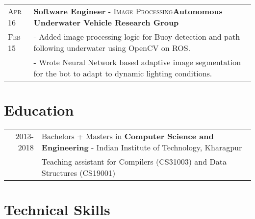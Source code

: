 \documentclass[a4paper,10pt]{extarticle} %
\begin{document}
\begin{tabularx}{\linewidth}{ l | X }
\textsc{Apr 16} & \textbf{Software Engineer} \textsc{- Image Processing}\hfill\textbf{Autonomous Underwater Vehicle Research Group}\\
\textsc{Feb 15} & {- Added image processing logic for Buoy detection and path following underwater using OpenCV on ROS.}\\
& {- Wrote Neural Network based adaptive image segmentation for the bot to adapt to dynamic lighting conditions.}\\
\end{tabularx}


\vspace{0.1cm}
\section{\textcolor{primary}{Education}}

\begin{tabular}{r|p{17.5cm}}	
\textsc{2013-2018} & Bachelors + Masters in \textbf{Computer Science and Engineering} - Indian Institute of Technology, Kharagpur\\
&Teaching assistant for Compilers (CS31003) and Data Structures (CS19001)\\
\end{tabular}


\vspace{0.1cm}
\section{\textcolor{primary}{Technical Skills}}
\end{document}

